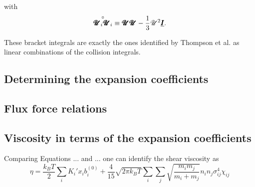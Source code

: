 with 
\begin{equation}
    \overset{\circ}{\pmb{\mathscr{U}}_i \pmb{\mathscr{U}}_i} \equiv \pmb{\mathscr{U}} \pmb{\mathscr{U}} - \frac{1}{3}\mathscr{U}^2 \underline{\pmb{I}}.
\end{equation}

These bracket integrals are exactly the ones identified by Thompson et al. as linear combinations of the collision integrals.\cite{kinetics_viscosity}

\subsection{Determining the expansion coefficients}

\subsection{Flux force relations}

\subsection{Viscosity in terms of the expansion coefficients}

Comparing Equations ... and ... one can identify the shear viscosity as
\begin{equation}
    \eta = \frac{k_B T}{2} \sum_i K_i' x_i b_i^{(0)} + \frac{4}{15} \sqrt{2 \pi k_B T} \sum_i \sum_j \sqrt{\frac{m_i m_j}{m_i + m_j}} n_i n_j \sigma_{ij}^4 \chi_{ij}
\end{equation}